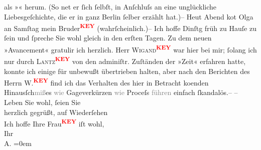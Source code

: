 \begin{ledgroupsized}[t]{13cm}
               als »\label{K_L02980-1v}\label{K_L02980-1h}« herum. (So ne{\geminationn}t er ſich ſelbſt, in Anſchluſs an
               eine unglückliche Liebesgeſchichte, die er in ganz Berlin ſelber erzählt hat.)– Heut Abend ko{\geminationm}t Olga an {\pb}Samſtag mein Bruder\textcolor{red}{\textsuperscript{\textbf{KEY}}} (wahrſcheinlich.)– Ich hoffe Dinſtg früh zu Hauſe zu
               ſein und ſpreche Sie wohl gleich in den erſten Tagen. Zu dem neuen »Avancement«
               gratulir ich herzlich. Herr \textsc{Wigand\textcolor{red}{\textsuperscript{\textbf{KEY}}}} war hier bei mir; ſolang ich nur durch \textsc{Lantz\textcolor{red}{\textsuperscript{\textbf{KEY}}}} von den adminiſtr. Zuſtänden der »Zeit«
               erfahren hatte, konnte ich einige für {\pb}unbewußt übertrieben halten, aber nach den Berichten des Herrn W.\textcolor{red}{\textsuperscript{\textbf{KEY}}} find ich das Verhalten des hier in Betracht ko{\geminationm}enden Hinausſch\textcolor{gray}{miß}es \textcolor{gray}{wie} Gageverkürzen \textcolor{gray}{wie }Proceſs \textcolor{gray}{führen} einfach
               ſkandalös.– \pend
           \pstart
           – Leben Sie wohl, ſeien Sie {\\[\baselineskip]}herzlich gegrüßt, auf Wiederſehen {\\[\baselineskip]}Ich
               hoffe Ihre Frau\textcolor{red}{\textsuperscript{\textbf{KEY}}} iſt wohl, {\\[\baselineskip]}Ihr {\\[\baselineskip]}\spacefill\mbox{A.}\pend
           \leftskip=0em{}
         
         \endnumbering{}\end{ledgroupsized}\begin{anhang}\end{anhang}\newcommand{\dateiname}{L02980}\newcommand{\titel}{Arthur Schnitzler an Felix Salten, 4. 1. 1903}\newcommand{\editorInnen}{Martin Anton Müller und Laura Untner}
      